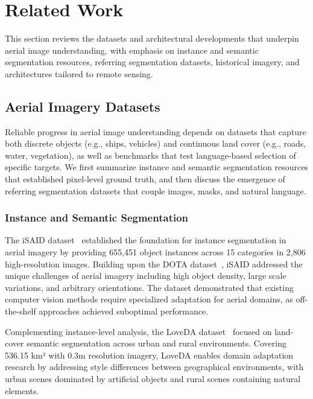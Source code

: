 
\section{Related Work}
\label{sec:related}

This section reviews the datasets and architectural developments that underpin aerial image understanding, with emphasis on instance and semantic segmentation resources, referring segmentation datasets, historical imagery, and architectures tailored to remote sensing.

\subsection{Aerial Imagery Datasets}

Reliable progress in aerial image understanding depends on datasets that capture both discrete objects (e.g., ships, vehicles) and continuous land cover (e.g., roads, water, vegetation), as well as benchmarks that test language-based selection of specific targets. We first summarize instance and semantic segmentation resources that established pixel-level ground truth, and then discuss the emergence of referring segmentation datasets that couple images, masks, and natural language.

\subsubsection{Instance and Semantic Segmentation}

The iSAID dataset~\cite{zamir2019isaid} established the foundation for instance segmentation in aerial imagery by providing 655,451 object instances across 15 categories in 2,806 high-resolution images. Building upon the DOTA dataset~\cite{xia2018dota}, iSAID addressed the unique challenges of aerial imagery including high object density, large scale variations, and arbitrary orientations. The dataset demonstrated that existing computer vision methods require specialized adaptation for aerial domains, as off-the-shelf approaches achieved suboptimal performance.

Complementing instance-level analysis, the LoveDA dataset~\cite{wang2021loveda} focused on land-cover semantic segmentation across urban and rural environments. Covering 536.15 km² with 0.3m resolution imagery, LoveDA enables domain adaptation research by addressing style differences between geographical environments, with urban scenes dominated by artificial objects and rural scenes containing natural elements.

